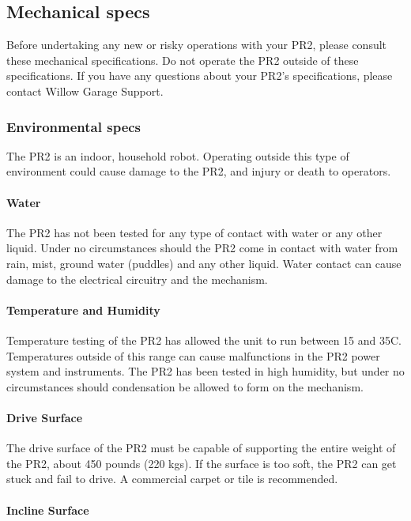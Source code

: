 \subsection{Mechanical specs}

Before undertaking any new or risky operations with your PR2, please consult these mechanical specifications. Do not operate the PR2 outside of these specifications. If you have any questions about your PR2's specifications, please contact Willow Garage Support.

\subsubsection{Environmental specs}

The PR2 is an indoor, household robot. Operating outside this type of environment could cause damage to the PR2, and  injury or death to operators.

\paragraph{Water}

The PR2 has not been tested for any type of contact with water or any other liquid. Under no circumstances should the PR2 come in contact with water from rain, mist, ground water (puddles) and any other liquid. Water contact can cause damage to the electrical circuitry and the mechanism.

\paragraph{Temperature and Humidity}

Temperature testing of the PR2 has allowed the unit to run between 15 and 35C. Temperatures outside of this range can cause malfunctions in the PR2 power system and instruments. The PR2 has been tested in high humidity, but under no circumstances should condensation be allowed to form on the mechanism.

\paragraph{Drive Surface}

The drive surface of the PR2 must be capable of supporting the entire weight of the PR2, about 450 pounds (220 kgs). If the surface is too soft, the PR2 can get stuck and fail to drive. A commercial carpet or tile is recommended. 

\paragraph{Incline Surface}

